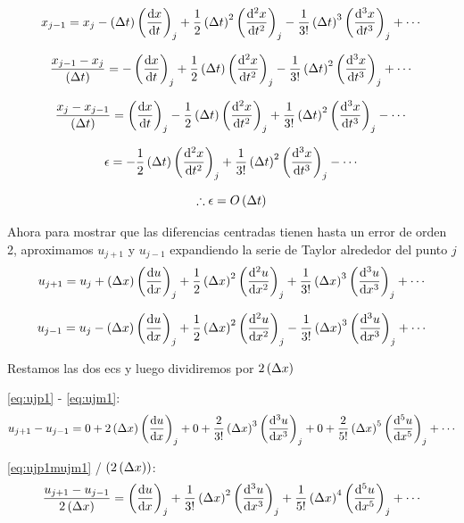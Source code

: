 \documentclass{article}
\numberwithin{figure}{section}
\numberwithin{equation}{section} %
\begin{document}
\begin{equation}
x_{j-1} = x_j - \Dt\derord{x}{t} + \frac12\Dt^2\derord[2]{x}{t}
- \frac1{3!}\Dt^3\derord[3]{x}{t} + \cdots
\end{equation}

\begin{equation}
\frac{x_{j-1} - x_j}{\Dt} = - \derord{x}{t} +
\frac12\Dt\derord[2]{x}{t} - 
	\frac1{3!}\dxdero{x}{t}{3} + \cdots
\end{equation}

\begin{equation}
\frac{x_{j} - x_{j-1}}{\Dt} = \derord{x}{t} -
\frac12\Dt\derord[2]{x}{t} + \frac1{3!}\dxdero{x}{t}{3} -
\cdots
\end{equation}

\begin{equation}
\epsilon = - \frac12\Dt\derord[2]{x}{t} + \frac1{3!}\dxdero{x}{t}{3} - \cdots
\end{equation}

\begin{equation}
\therefore \epsilon = O\left( \Delta t \right)
\end{equation}

Ahora para mostrar que las diferencias centradas tienen hasta un error de orden 2,
aproximamos $u_{j+1}$ y $u_{j-1}$ expandiendo la serie de Taylor alrededor del punto $j$
\begin{equation}
u_{j+1} = u_j + \Dx\derord{u}{x} + 
\frac12\Dx^2\derord[2]{u}{x} + 
\frac1{3!}\Dx^3\derord[3]{u}{x} + \cdots
\label{eq:ujp1}
\end{equation}

\begin{equation}
u_{j-1} = u_j - \Dx\derord{u}{x} + 
\frac12\Dx^2\derord[2]{u}{x} - 
\frac1{3!}\Dx^3\derord[3]{u}{x} + \cdots
\label{eq:ujm1}
\end{equation}

Restamos las dos ecs y luego dividiremos por $2\left( \Delta x \right)$ 

\eqref{eq:ujp1} - \eqref{eq:ujm1}:
\begin{equation}
u_{j+1} - u_{j-1} = 0 + 2\Dx\derord{u}{x} + 0 +
\frac2{3!}\Dx^3\derord[3]{u}{x} + 0 +
\frac2{5!}\Dx^5\derord[5]{u}{x} + \cdots
\label{eq:ujp1mujm1}
\end{equation}

\eqref{eq:ujp1mujm1} / $( 2\left( \Delta x \right) )$:
\begin{equation}
\frac{u_{j+1} - u_{j-1}}{2\Dx} = \derord{u}{x} +
\frac1{3!}\Dx^2\derord[3]{u}{x} +
\frac1{5!}\Dx^4\derord[5]{u}{x} + \cdots
\label{eq:ujp1mujm1_s}
\end{equation}
\end{document}
